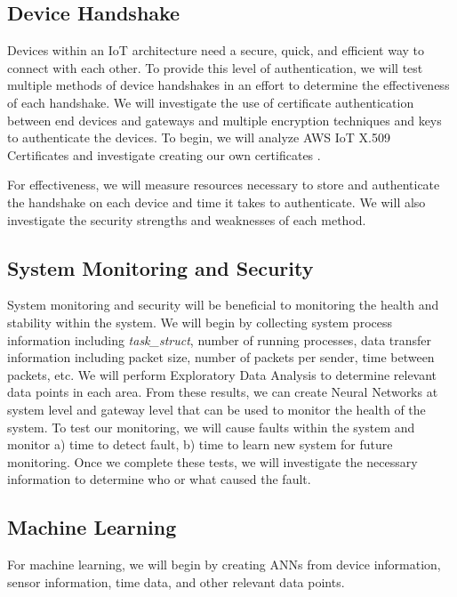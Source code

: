 \documentclass[../main.tex]{subfiles}
\begin{document}
\subsection{Device Handshake}

Devices within an IoT architecture need a secure, quick, and efficient way to connect with each other. To provide this level of authentication, we will test multiple methods of device handshakes in an effort to determine the effectiveness of each handshake. We will investigate the use of certificate authentication between end devices and gateways and multiple encryption techniques and keys to authenticate the devices. To begin, we will analyze AWS IoT X.509 Certificates and investigate creating our own certificates \cite{aws,atmel_certs}. 

For effectiveness, we will measure resources necessary to store and authenticate the handshake on each device and time it takes to authenticate. We will also investigate the security strengths and weaknesses of each method.

\subsection{System Monitoring and Security}

System monitoring and security will be beneficial to monitoring the health and stability within the system. We will begin by collecting system process information including \textit{task\_struct}, number of running processes, data transfer information including packet size, number of packets per sender, time between packets, etc. We will perform Exploratory Data Analysis to determine relevant data points in each area. From these results, we can create Neural Networks at system level and gateway level that can be used to monitor the health of the system. To test our monitoring, we will cause faults within the system and monitor a) time to detect fault, b) time to learn new system for future monitoring. Once we complete these tests, we will investigate the necessary information to determine who or what caused the fault. 

\subsection{Machine Learning}

For machine learning, we will begin by creating ANNs from device information, sensor information, time data, and other relevant data points. 
\end{document}
